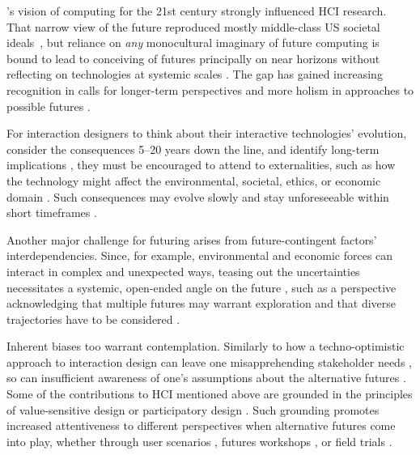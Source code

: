 \citeauthor{weiser1991computer}’s vision of computing for the 21st century \cite{weiser1991computer} strongly influenced HCI research. That narrow view of the future reproduced mostly middle-class US societal ideals~\cite{bell_yesterdays_2007}, 
but reliance on \emph{any} monocultural imaginary of future computing is bound to lead to conceiving of futures principally on near horizons without reflecting on technologies at systemic scales \cite{nathan_envisioning_2008, mankoffLookingYesterdayTomorrow2013a}. 
The gap has gained increasing recognition in calls for longer-term perspectives and more holism in approaches to possible futures \cite{nathan_envisioning_2008, mankoffLookingYesterdayTomorrow2013a, salovaaraEvaluationPrototypesProblem2017, epp2022reinventing, elsden_speculative_2017, pargmanSustainabilityImaginedFuture2017, lightCollaborativeSpeculationAnticipation2021a}.

For interaction designers to think about their interactive technologies' evolution, consider the consequences 5--20 years down the line, and identify long-term implications \cite{nathan_envisioning_2008, mankoffLookingYesterdayTomorrow2013a}, they must be encouraged to attend to externalities, such as how the technology might affect the environmental, societal, ethics, or economic domain \cite{nathan_envisioning_2008, mankoffLookingYesterdayTomorrow2013a, pargmanSustainabilityImaginedFuture2017, epp2022reinventing, moesgenDesigningUncertainFutures2023}. Such consequences may evolve slowly and stay unforeseeable within short timeframes \cite{pargmanSustainabilityImaginedFuture2017}.

Another major challenge for futuring arises from future-contin\-gent factors' interdependencies. 
Since, for example, environmental and economic forces can interact in complex and
unexpected ways, teasing out the uncertainties necessitates a systemic, open-ended angle on the future 
\cite{jouvenelArtConjecture1967, adamFutureMattersAction2007, poli_anticipation_2019}, such as a perspective acknowledging that multiple futures may warrant exploration and that diverse trajectories have to be considered \cite{pargmanSustainabilityImaginedFuture2017, salovaaraEvaluationPrototypesProblem2017, epp2022reinventing, moesgenDesigningUncertainFutures2023}.

Inherent biases too warrant contemplation. Similarly to how a techno-optimistic approach to interaction design can leave one misapprehending stakeholder needs \cite{nathan_envisioning_2008}, so can insufficient awareness of one's assumptions about the alternative futures \cite{bell_yesterdays_2007, nathan_envisioning_2008, kinsleyFuturesMakingPractices2012, mankoffLookingYesterdayTomorrow2013a}. Some of the contributions to HCI mentioned above are grounded in the principles of value-sensitive design \cite{nathan_envisioning_2008} or participatory design \cite{elsden_speculative_2017, epp2022reinventing}.
Such grounding promotes increased attentiveness to different perspectives when alternative futures come into play, whether through user scenarios \cite{nathan_envisioning_2008}, futures workshops \cite{epp2022reinventing}, or field trials \cite{elsden_speculative_2017, odom_fieldwork_2012}.  

